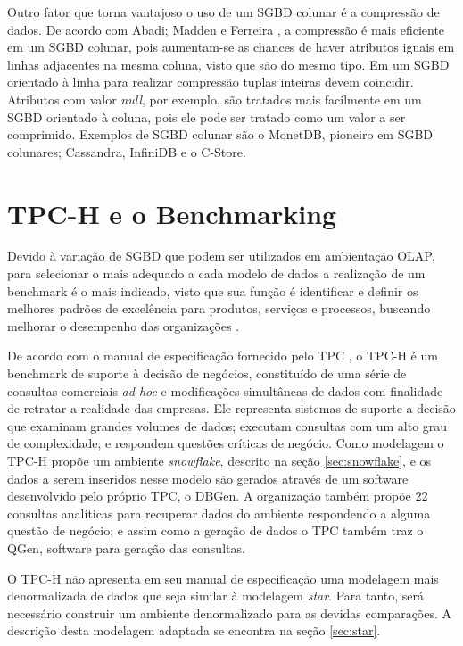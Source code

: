 \documentclass[conference]{IEEEtran}
\begin{document}
Outro fator que torna vantajoso o uso de um SGBD colunar é a compressão de dados. De acordo com Abadi; Madden e Ferreira \cite{abadi2006integrating}, a compressão é mais eficiente em um SGBD colunar, pois aumentam-se as chances de haver atributos iguais em linhas adjacentes na mesma coluna, visto que são do mesmo tipo. Em um SGBD orientado à linha para realizar compressão tuplas inteiras devem coincidir. Atributos com valor \textit{null}, por exemplo, são tratados mais facilmente em um SGBD orientado à coluna, pois ele pode ser tratado como um valor a ser comprimido. Exemplos de SGBD colunar são o MonetDB, pioneiro em SGBD colunares; Cassandra, InfiniDB e o C-Store.

\section{TPC-H e o Benchmarking}

Devido à variação de SGBD que podem ser utilizados em ambientação OLAP, para selecionar o mais adequado a cada modelo de dados a realização de um benchmark é o mais indicado, visto que sua função é identificar e definir os melhores padrões de excelência para produtos, serviços e processos, buscando melhorar o desempenho das organizações \cite{kyro2003revising,bhutta1999benchmarking}.

De acordo com o manual de especificação fornecido pelo TPC \cite{tpc2017specs}, o TPC-H é um benchmark de suporte à decisão de negócios, constituído de uma série de consultas comerciais \textit{ad-hoc} e modificações simultâneas de dados com finalidade de retratar a realidade das empresas. Ele representa sistemas de suporte a decisão que examinam grandes volumes de dados; executam consultas com um alto grau de complexidade; e respondem questões críticas de negócio. Como modelagem o TPC-H propõe um ambiente \textit{snowflake}, descrito na seção \ref{sec:snowflake}, e os dados a serem inseridos nesse modelo são gerados através de um software desenvolvido pelo próprio TPC, o DBGen. A organização também propõe 22 consultas analíticas para recuperar dados do ambiente respondendo a alguma questão de negócio; e assim como a geração de dados o TPC também traz o QGen, software para geração das consultas.

O TPC-H não apresenta em seu manual de especificação uma modelagem mais denormalizada de dados que seja similar à modelagem \textit{star}. Para tanto, será necessário construir um ambiente denormalizado para as devidas comparações. A descrição desta modelagem adaptada se encontra na seção \ref{sec:star}.
\end{document}
